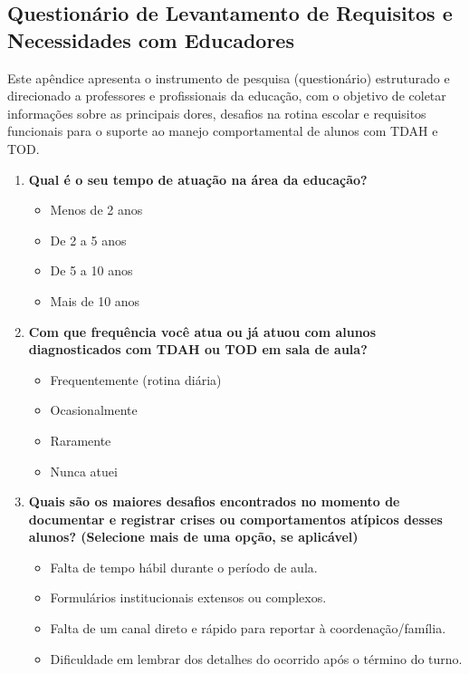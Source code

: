 \documentclass[%
    	        oneside,                   %
]{configuracoes/norma-abntex2}
\begin{document}
    \postextual
\begin{apendicesenv}

\chapter{Questionário de Levantamento de Requisitos e Necessidades com Educadores}
\label{ap:questionario_educadores}

Este apêndice apresenta o instrumento de pesquisa (questionário) estruturado e direcionado a professores e profissionais da educação, com o objetivo de coletar informações sobre as principais dores, desafios na rotina escolar e requisitos funcionais para o suporte ao manejo comportamental de alunos com TDAH e TOD.

\begin{enumerate}
    \item \textbf{Qual é o seu tempo de atuação na área da educação?}
    \begin{itemize}
        \item[ ] Menos de 2 anos
        \item[ ] De 2 a 5 anos
        \item[ ] De 5 a 10 anos
        \item[ ] Mais de 10 anos
    \end{itemize}
    
    \item \textbf{Com que frequência você atua ou já atuou com alunos diagnosticados com TDAH ou TOD em sala de aula?}
    \begin{itemize}
        \item[ ] Frequentemente (rotina diária)
        \item[ ] Ocasionalmente
        \item[ ] Raramente
        \item[ ] Nunca atuei
    \end{itemize}

    \item \textbf{Quais são os maiores desafios encontrados no momento de documentar e registrar crises ou comportamentos atípicos desses alunos? (Selecione mais de uma opção, se aplicável)}
    \begin{itemize}
        \item[ ] Falta de tempo hábil durante o período de aula.
        \item[ ] Formulários institucionais extensos ou complexos.
        \item[ ] Falta de um canal direto e rápido para reportar à coordenação/família.
        \item[ ] Dificuldade em lembrar dos detalhes do ocorrido após o término do turno.
    \end{itemize}


\end{enumerate}
\end{apendicesenv}
\end{document}

